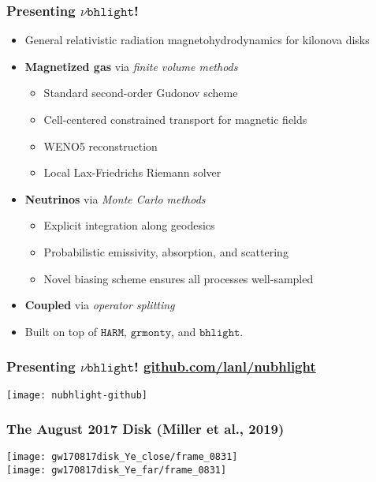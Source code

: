 \documentclass[]{beamer}
\begin{document}
\begin{frame}
  \frametitle{Presenting $\nu\texttt{bhlight}$!}
  \begin{itemize}
  \item General relativistic radiation magnetohydrodynamics for kilonova disks
  \item \textbf{Magnetized gas} via \textit{finite volume methods}
    \begin{itemize}
    \item Standard second-order Gudonov scheme
    \item Cell-centered constrained transport for magnetic fields
    \item WENO5 reconstruction
    \item Local Lax-Friedrichs Riemann solver
    \end{itemize}
  \item \textbf{Neutrinos} via \textit{Monte Carlo methods}
    \begin{itemize}
    \item Explicit integration along geodesics
    \item Probabilistic emissivity, absorption, and scattering
    \item Novel biasing scheme ensures all processes well-sampled
    \end{itemize}
  \item \textbf{Coupled} via \textit{operator splitting}
  \item Built on top of $\texttt{HARM}$, $\texttt{grmonty}$, and
    $\texttt{bhlight}$.
  \end{itemize}
\end{frame}

\begin{frame}
  \frametitle{Presenting $\nu\texttt{bhlight}$! \url{github.com/lanl/nubhlight}}
  \begin{center}
    \texttt{[image: nubhlight-github]}
  \end{center}
\end{frame}

\begin{frame}
  \frametitle{The August 2017 Disk (Miller et al., 2019)}
  \begin{center}
    \texttt{[image: gw170817disk\_Ye\_close/frame\_0831]} \\
    \texttt{[image: gw170817disk\_Ye\_far/frame\_0831]} 
  \end{center}
\end{frame}
\end{document}
